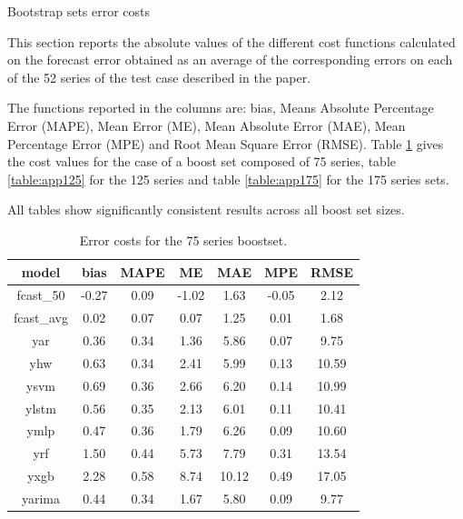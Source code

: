 \documentclass[ijoc,sglanonrev]{informs4}
\begin{document}
%
\begin{APPENDIX}{Bootstrap sets error costs} \label{app:errcost}
\clearpage %

This section reports the absolute values of the different cost functions calculated on the forecast error obtained as an average of the corresponding errors on each of the 52 series of the test case described in the paper.

The functions reported in the columns are: bias, Means Absolute Percentage Error (MAPE), Mean Error (ME), Mean Absolute Error (MAE), Mean Percentage Error (MPE) and Root Mean Square Error (RMSE). Table \ref{table:app75} gives the cost values for the case of a boost set composed of 75 series, table \ref{table:app125} for the 125 series and table \ref{table:app175} for the 175 series sets.

All tables show significantly consistent results across all boost set sizes.

\begin{table}
\centering
\renewcommand{\arraystretch}{0.75}
\begin{tabular}{ccccccc}
model & bias & MAPE & ME & MAE & MPE & RMSE \\
\hline
fcast\_50   &-0.27 & 0.09 &-1.02 & 1.63 &-0.05 &  2.12 \\
fcast\_avg  & 0.02 & 0.07 & 0.07 & 1.25 & 0.01 &  1.68 \\
yar         & 0.36 & 0.34 & 1.36 & 5.86 & 0.07 &  9.75 \\
yhw         & 0.63 & 0.34 & 2.41 & 5.99 & 0.13 & 10.59 \\
ysvm        & 0.69 & 0.36 & 2.66 & 6.20 & 0.14 & 10.99 \\
ylstm       & 0.56 & 0.35 & 2.13 & 6.01 & 0.11 & 10.41 \\
ymlp        & 0.47 & 0.36 & 1.79 & 6.26 & 0.09 & 10.60 \\
yrf         & 1.50 & 0.44 & 5.73 & 7.79 & 0.31 & 13.54 \\
yxgb        & 2.28 & 0.58 & 8.74 &10.12 & 0.49 & 17.05 \\
yarima      & 0.44 & 0.34 & 1.67 & 5.80 & 0.09 &  9.77 \\
\hline
\end{tabular}
\caption{Error costs for the 75 series boostset.}
\label{table:app75}
\end{table}


\end{APPENDIX}
\end{document}
